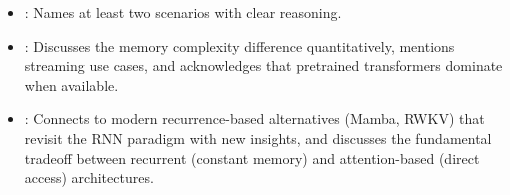 \begin{interviewq}
\goodgreat
\begin{itemize}
\item {}: Names at least two scenarios with clear reasoning.
\item {}: Discusses the memory complexity difference
  quantitatively, mentions streaming use cases, and acknowledges that
  pretrained transformers dominate when available.
\item {}: Connects to modern recurrence-based alternatives
  (Mamba, RWKV) that revisit the RNN paradigm with new insights, and
  discusses the fundamental tradeoff between recurrent (constant memory)
  and attention-based (direct access) architectures.
\end{itemize}

\end{interviewq}

